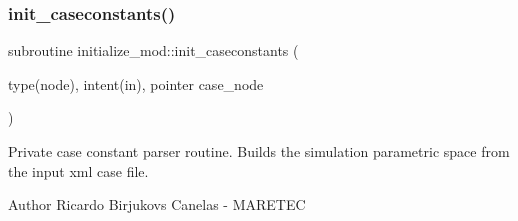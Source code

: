 \subsubsection{\texorpdfstring{init\+\_\+caseconstants()}{init\_caseconstants()}}
{\footnotesize\ttfamily subroutine initialize\+\_\+mod\+::init\+\_\+caseconstants (\begin{DoxyParamCaption}\item[{type(node), intent(in), pointer}]{case\+\_\+node }\end{DoxyParamCaption})\hspace{0.3cm}{\ttfamily [private]}}



Private case constant parser routine. Builds the simulation parametric space from the input xml case file. 

\begin{DoxyAuthor}{Author}
Ricardo Birjukovs Canelas -\/ M\+A\+R\+E\+T\+EC 
\end{DoxyAuthor}

